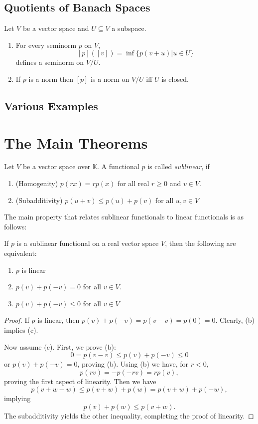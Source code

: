 \documentclass[prb,12pt]{revtex4-2}
\theoremstyle{definition}
\theoremstyle{definition}
\theoremstyle{definition}
\newenvironment{parts}{\begin{enumerate}[label=(\alph*)]}{\end{enumerate}}
\begin{document}
	\subsection{Quotients of Banach Spaces}
	\begin{Theorem}
		Let $V$ be a vector space and $U\subseteq V$ a subspace. 
		\begin{parts}
			\item For every seminorm $p$ on $V$,
			\[[p]([v])=\inf\{p(v+u)|u\in U\}\]
			defines a seminorm on $V/U$.
			\item If $p$ is a norm then $[p]$ is a norm on $V/U$ iff $U$ is closed.
		\end{parts}
	\end{Theorem}
	\begin{Definition}
	\end{Definition}
	\begin{Theorem}
	\end{Theorem}
	\subsection{Various Examples}
	\section{The Main Theorems}
	\begin{Definition}
		Let $V$ be a vector space over $\mathbb{K}$. A functional $p$ is called \emph{sublinear}, if
		\begin{parts}
			\item (Homogenity) $p(rx)=rp(x)$ for all real $r\ge 0$ and $v\in V$.
			\item (Subadditivity) $p(u+v)\le p(u)+p(v)$ for all $u,v\in V$
		\end{parts}
	\end{Definition}
The main property that relates sublinear functionals to linear functionals is as follows:
\begin{Theorem}
	If $p$ is a sublinear functional on a real vector space $V$, then the following are equivalent:
	\begin{parts}
	\item $p$ is linear
	\item $p(v)+p(-v)=0$ for all $v\in V$.
	\item $p(v)+p(-v)\le 0$ for all $v\in V$
	\end{parts}
\end{Theorem}
\begin{proof}
	If $p$ is linear, then $p(v)+p(-v)=p(v-v)=p(0)=0$. Clearly, (b) implies (c).

	Now assume (c). First, we prove (b):
	\[
	0=p(v-v)\le p(v)+p(-v) \le 0
	\]
	or $p(v)+p(-v)=0$, proving (b). Using (b) we have, for $r<0$,
	\[
	p(rv)=-p(-rv)=rp(v)
	,\]
	proving the first aspect of linearity. Then we have
	\[
	p(v+w-w)\le p(v+w)+p(w)=p(v+w)+p(-w)
	,\]
	implying
	\[
	p(v)+p(w)\le p(v+w)
	.\] 
	The subadditivity yields the other inequality, completing the proof of linearity.
\end{proof}
\end{document}
